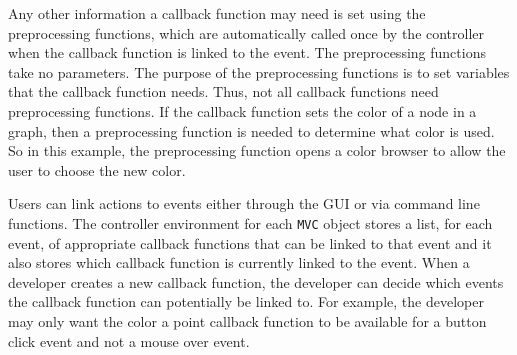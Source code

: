 \documentclass[11pt]{article}
\newcommand{\Robject}[1]{{\texttt{#1}}}
\begin{document}
Any other information a callback function may need is set using the
preprocessing functions, which are automatically called once by the controller
when the callback
function is linked to the event.  The preprocessing functions take no
parameters.  The purpose of the preprocessing functions is to set
variables that the callback function needs.  Thus, not all callback
functions need preprocessing functions.  If the callback
function sets the color of a node in a graph, then a preprocessing
function is needed to determine what color is used.  So in this
example, the preprocessing function opens a color browser to allow the
user to choose the new color.

Users can link actions to events either through the GUI or via
command line functions.  The controller environment for each \Robject{MVC}
object stores a list, for each event, of appropriate callback functions that
can be linked to that event and it also stores which callback function is
currently linked to the event.  When a developer creates a new callback
function, the developer can decide which events the callback function can
potentially be linked to.  For example, the developer may only want the color
a point callback function to be available for a button click event and not a
mouse over event.
\end{document}

